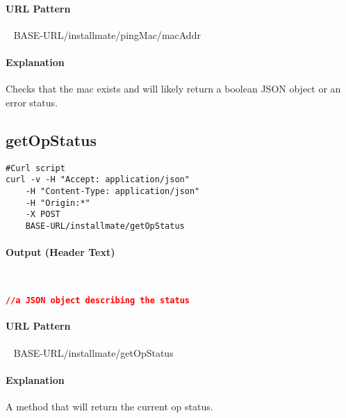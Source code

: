 \documentclass[
10pt, %
letterpaper, %
oneside, %
headinclude,footinclude, %
BCOR5mm, %
]{scrartcl}
\begin{document}
\paragraph{URL Pattern} 
~\newline
BASE-URL/installmate/pingMac/{macAddr}

\paragraph{Explanation} Checks that the mac exists and will likely return a boolean JSON object or an error status.


\subsection{getOpStatus}

\begin{lstlisting}
#Curl script
curl -v -H "Accept: application/json" 
	-H "Content-Type: application/json" 
	-H "Origin:*"
	-X POST 
	BASE-URL/installmate/getOpStatus
\end{lstlisting}

\paragraph{Output (Header Text)}~
\begin{lstlisting}[language=json]
//a JSON object describing the status
\end{lstlisting}

\paragraph{URL Pattern} 
~\newline
BASE-URL/installmate/getOpStatus

\paragraph{Explanation} A method that will return the current op status.
\end{document}
